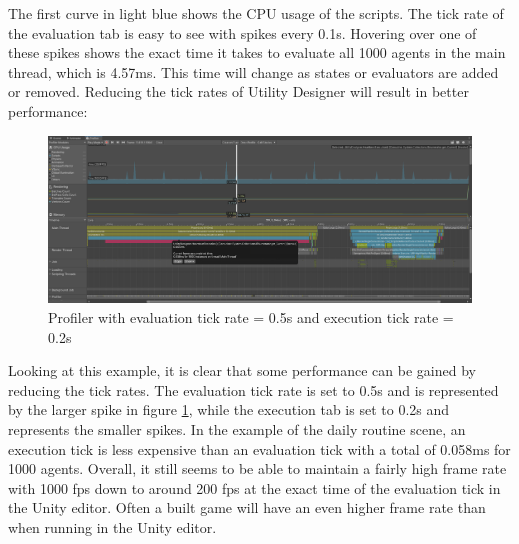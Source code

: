 The first curve in light blue shows the CPU usage of the scripts. The tick rate of the evaluation tab is easy to see with spikes every 0.1s. Hovering over one of these spikes shows the exact time it takes to evaluate all 1000 agents in the main thread, which is 4.57ms. This time will change as states or evaluators are added or removed. Reducing the tick rates of Utility Designer will result in better performance:

\begin{figure}[H]
	\centering
		\includegraphics[scale=0.302]{images/utility_designer_profiling_2.png}
	\caption{Profiler with evaluation tick rate = 0.5s and execution tick rate = 0.2s}
	\label{fig:utility_designer_profiling_2}
\end{figure}

Looking at this example, it is clear that some performance can be gained by reducing the tick rates. The evaluation tick rate is set to 0.5s and is represented by the larger spike in figure \ref{fig:utility_designer_profiling_2}, while the execution tab is set to 0.2s and represents the smaller spikes. In the example of the daily routine scene, an execution tick is less expensive than an evaluation tick with a total of 0.058ms for 1000 agents. Overall, it still seems to be able to maintain a fairly high frame rate with 1000 fps down to around 200 fps at the exact time of the evaluation tick in the Unity editor. Often a built game will have an even higher frame rate than when running in the Unity editor.